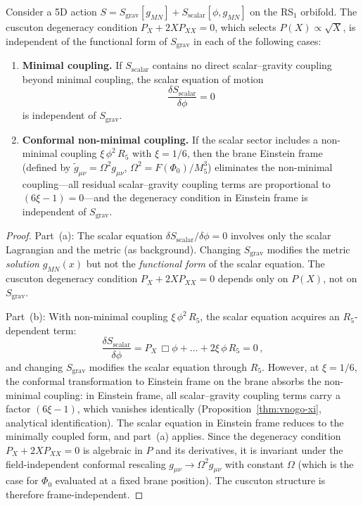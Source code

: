 \begin{proposition}
\label{thm:sgdecoupling}
Consider a 5D action $S = S_{\mathrm{grav}}[g_{MN}] + S_{\mathrm{scalar}}[\phi, g_{MN}]$ on the RS$_1$ orbifold. The cuscuton degeneracy condition $P_X + 2X P_{XX} = 0$, which selects $P(X) \propto \sqrt{X}$, is independent of the functional form of $S_{\mathrm{grav}}$ in each of the following cases:
\begin{enumerate}
  \item[\emph{(a)}] \textbf{Minimal coupling.} If $S_{\mathrm{scalar}}$ contains no direct scalar--gravity coupling beyond minimal coupling, the scalar equation of motion
\begin{equation}
  \frac{\delta S_{\mathrm{scalar}}}{\delta\phi} = 0
  \label{eq:3-28}
\end{equation}
is independent of $S_{\mathrm{grav}}$.
  \item[\emph{(b)}] \textbf{Conformal non-minimal coupling.} If the scalar sector includes a non-minimal coupling $\xi\,\phi^2\,R_5$ with $\xi = 1/6$, then the brane Einstein frame (defined by $\tilde{g}_{\mu\nu} = \Omega^2 g_{\mu\nu}$, $\Omega^2 = F(\Phi_0)/M_5^3$) eliminates the non-minimal coupling---all residual scalar--gravity coupling terms are proportional to $(6\xi - 1) = 0$---and the degeneracy condition in Einstein frame is independent of $S_{\mathrm{grav}}$.
\end{enumerate}
\end{proposition}

\begin{proof}
Part~(a): The scalar equation $\delta S_{\mathrm{scalar}}/\delta\phi = 0$ involves only the scalar Lagrangian and the metric (as background). Changing $S_{\mathrm{grav}}$ modifies the metric \emph{solution} $g_{MN}(x)$ but not the \emph{functional form} of the scalar equation. The cuscuton degeneracy condition $P_X + 2X P_{XX} = 0$ depends only on $P(X)$, not on $S_{\mathrm{grav}}$.

Part~(b): With non-minimal coupling $\xi\,\phi^2\,R_5$, the scalar equation acquires an $R_5$-dependent term:
\begin{equation}
  \frac{\delta S_{\mathrm{scalar}}}{\delta\phi} = P_X\,\Box\phi + \ldots + 2\xi\,\phi\,R_5 = 0\,,
\end{equation}
and changing $S_{\mathrm{grav}}$ modifies the scalar equation through $R_5$. However, at $\xi = 1/6$, the conformal transformation to Einstein frame on the brane absorbs the non-minimal coupling: in Einstein frame, all scalar--gravity coupling terms carry a factor $(6\xi - 1)$, which vanishes identically (Proposition~\ref{thm:vnogo-xi}, analytical identification). The scalar equation in Einstein frame reduces to the minimally coupled form, and part~(a) applies. Since the degeneracy condition $P_X + 2X P_{XX} = 0$ is algebraic in $P$ and its derivatives, it is invariant under the field-independent conformal rescaling $g_{\mu\nu} \to \Omega^2 g_{\mu\nu}$ with constant $\Omega$ (which is the case for $\Phi_0$ evaluated at a fixed brane position). The cuscuton structure is therefore frame-independent.
\end{proof}

